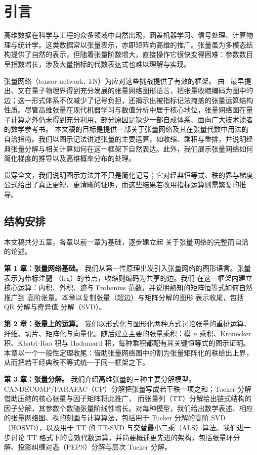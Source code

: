 \newpage
\section*{引言}
高维数据在科学与工程的众多领域中自然出现，涵盖机器学习、信号处理、计算物理与统计学。这类数据常以张量表示，亦即矩阵向高维的推广。张量虽为多模态结构提供了自然的表示，但随着张量阶数增大，直接操作它很快变得困难：参数数目呈指数增长，涉及大量指标的代数表达式也难以理解与实现。

张量网络（tensor network, TN）为应对这些挑战提供了有效的框架。
由~\cite{penrose1971applications} 最早提出、又在量子物理界得到充分发展的张量网络图形语言，把张量收缩编码为图中的边；这一形式体系不仅减少了记号负担，还揭示出被指标记法掩盖的张量运算结构性质。尽管高维张量在现代机器学习与数值分析中居于核心地位，张量网络图在量子计算之外仍未得到充分利用，部分原因是缺少一部自成体系、面向广大技术读者的数学参考书。
本文稿的目标是提供一部关于张量网络及其在张量代数中用法的自洽指南。我们以图示记法讲述张量的主要运算，如收缩、乘积与重排，并说明经典张量分解与相关计算如何在这一框架下自然表达。此外，我们展示张量网络如何简化梯度的推导以及高维概率分布的处理。

贯穿全文，我们说明图示方法并不只是简化记号；它对经典恒等式、秩的界与梯度公式给出了真正更短、更清晰的证明，而这些结果若改用指标运算则需繁复的推导。 



\subsection*{结构安排}

本文稿共分五章，各章以前一章为基础，逐步建立起 
关于张量网络的完整而自洽的论述。

\medskip
\noindent\textbf{第 1 章：张量网络基础。}
我们从第一性原理出发引入张量网络的图形语言。张量表示为带标注腿
（leg）的节点，收缩则编码为共享的边。我们
在这一框架内建立核心运算：内积、外积、迹与 Frobenius 范数，并说明熟知的矩阵恒等式如何自然推广到
高阶张量。本章以复制张量（超边）与矩阵分解的图形
表示收尾，包括 QR 分解与奇异值
分解（SVD）。

\medskip
\noindent\textbf{第 2 章：张量上的运算。}
我们以形式化与图形化两种方式讨论张量的重排运算、纤维、切片、矩阵化与向量化。随后建立主要的张量乘积：模 $n$ 
乘积、Kronecker 积、Khatri-Rao 积与 Hadamard 积，每种乘积都配有其关键恒等式的图示证明。本章以一个一般性定理收尾：借助张量网络图中的割为张量矩阵化的秩给出上界，从而把若干经典秩不等式统一于同一框架之下。

\medskip
\noindent\textbf{第 3 章：张量分解。}
我们介绍高维张量的三种主要分解模型。CANDECOMP/PARAFAC（CP）分解把张量写成若干秩一项之和；Tucker 分解借助压缩的核心张量与因子矩阵将此推广，
而张量列（TT）分解给出链式结构的因子分解，其参数个数随张量阶线性增长。对每种模型，我们给出数学表述、相应的张量网络图、秩的刻画与计算算法，包括用于 Tucker 分解的高阶 SVD（HOSVD），以及用于 TT 的 TT-SVD 与交替最小二乘（ALS）算法。我们进一步讨论 TT 格式下的高效代数运算，并简要概述更先进的架构，包括张量环分解、投影纠缠对态（PEPS）分解与层次 Tucker 分解。

